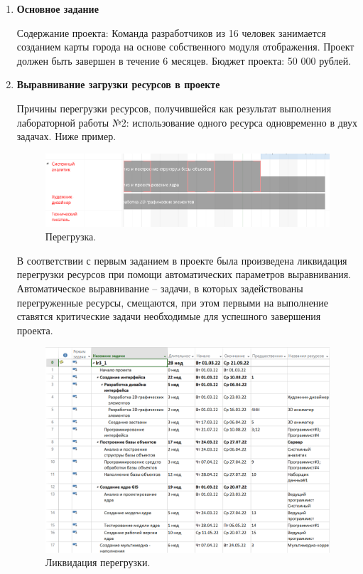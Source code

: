 \documentclass[a4paper,14pt]{extreport} %
\begin{document}
\begin{enumerate}

\item \textbf{Основное задание}

Содержание проекта: Команда разработчиков из 16 человек занимается созданием карты города на основе собственного модуля отображения. Проект должен быть завершен в течение 6 месяцев. Бюджет проекта: 50 000 рублей.

\item \textbf{Выравнивание загрузки ресурсов в проекте}

Причины перегрузки ресурсов, получившейся как результат выполнения лабораторной работы №2: использование одного ресурса одновременно в двух задачах. Ниже пример.

\begin{figure}[H]
  \centering
  \caption{Перегрузка. }
  \includegraphics[scale=0.7]{1}
\end{figure}

В соответствии с первым заданием в проекте была произведена ликвидация перегрузки ресурсов при помощи автоматических параметров выравнивания. Автоматическое выравнивание -- задачи, в которых задействованы перегруженные ресурсы, смещаются, при этом первыми на выполнение ставятся критические задачи необходимые для успешного завершения проекта.

\begin{figure}[H]
  \centering
  \caption{Ликвидация перегрузки. }
  \includegraphics[scale=0.7]{2}
\end{figure}


\end{enumerate}
\end{document}
